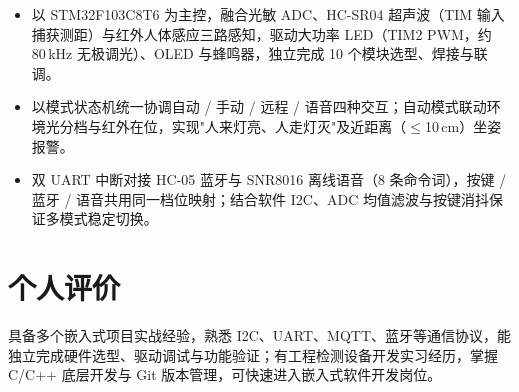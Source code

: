\documentclass[10pt,a4paper]{article}
\begin{document}
\begin{itemize}[leftmargin=1.5em, itemsep=2pt, parsep=0pt, topsep=2pt]
    \item 以 STM32F103C8T6 为主控，融合光敏 ADC、HC-SR04 超声波（TIM 输入捕获测距）与红外人体感应三路感知，驱动大功率 LED（TIM2 PWM，约 80\,kHz 无极调光）、OLED 与蜂鸣器，独立完成 10 个模块选型、焊接与联调。
    \item 以模式状态机统一协调自动 / 手动 / 远程 / 语音四种交互；自动模式联动环境光分档与红外在位，实现"人来灯亮、人走灯灭"及近距离（$\leq$10\,cm）坐姿报警。
    \item 双 UART 中断对接 HC-05 蓝牙与 SNR8016 离线语音（8 条命令词），按键 / 蓝牙 / 语音共用同一档位映射；结合软件 I2C、ADC 均值滤波与按键消抖保证多模式稳定切换。
\end{itemize}

\vspace{0.1em}

\section{\faUser\hspace{0.4em}个人评价}

具备多个嵌入式项目实战经验，熟悉 I2C、UART、MQTT、蓝牙等通信协议，能独立完成硬件选型、驱动调试与功能验证；有工程检测设备开发实习经历，掌握 C/C++ 底层开发与 Git 版本管理，可快速进入嵌入式软件开发岗位。
\end{document}
